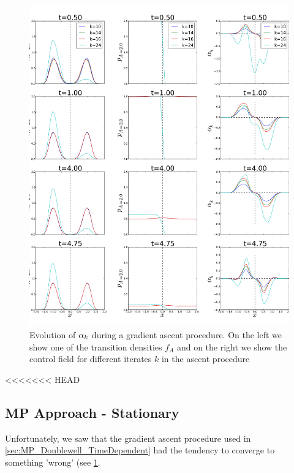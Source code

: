 \documentclass{article}
\begin{document}
\begin{figure}[htp]  
\begin{center}
  \includegraphics[width=\textwidth]{Figs/DoublewellFBSolver/FB_alpha_iterates_example.pdf}
  \caption[labelInTOC]{Evolution of ${\alpha}_k$ during a gradient ascent procedure.
  On the left we show one of the transition densities $f_{A}$ and on the right
  we show the control field for different iterates $k$ in the ascent
  procedure}
  \label{fig:alpha_iterates_double_well_example}
\end{center}
\end{figure}

\clearpage

<<<<<<< HEAD
\subsection{MP Approach - Stationary}
\label{sec:MP_Doublewell_Statinoary}
Unfortunately, we saw that the gradient ascent procedure used in
\cref{sec:MP_Doublewell_TimeDependent} had the tendency to converge to
something 'wrong' (see \cref{fig:alpha_iterates_double_well_example}. 
\end{document}
